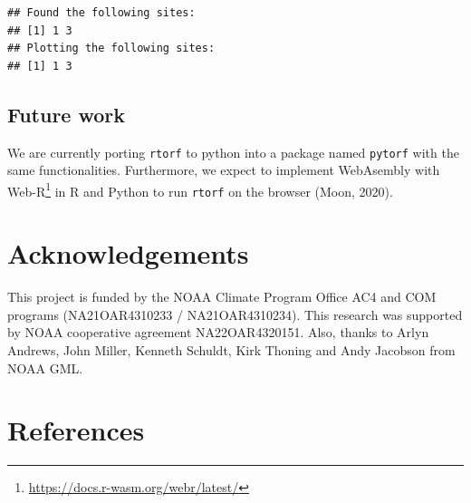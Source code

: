 \documentclass[10pt,a4paper,onecolumn]{article}
\begin{document}
\begin{verbatim}
## Found the following sites: 
## [1] 1 3
## Plotting the following sites: 
## [1] 1 3
\end{verbatim}


\subsection{Future work}\label{future-work}

We are currently porting \texttt{rtorf} to python into a package named
\texttt{pytorf} with the same functionalities. Furthermore, we expect to
implement WebAsembly with Web-R\footnote{\url{https://docs.r-wasm.org/webr/latest/}}
in R and Python to run \texttt{rtorf} on the browser (Moon, 2020).

\section{Acknowledgements}\label{acknowledgements}

This project is funded by the NOAA Climate Program Office AC4 and COM
programs (NA21OAR4310233 / NA21OAR4310234). This research was supported
by NOAA cooperative agreement NA22OAR4320151. Also, thanks to Arlyn
Andrews, John Miller, Kenneth Schuldt, Kirk Thoning and Andy Jacobson
from NOAA GML.

\section*{References}\label{references}
\end{document}
